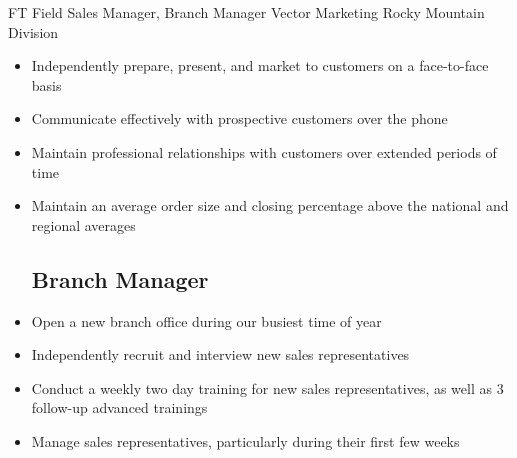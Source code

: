     {FT} %
    {Field Sales Manager, Branch Manager} %
    {Vector Marketing} %
    {Rocky Mountain Division}
    {\begin{itemize}
    \setlength\itemsep{0.1em}
        \subsection*{Field Sales Manager}
            \item Independently prepare, present, and market to customers on a face-to-face basis
            \item Communicate effectively with prospective customers over the phone
            \item Maintain professional relationships with customers over extended periods of time
            \item Maintain an average order size and closing percentage above the national and regional averages
        \subsection*{Branch Manager}
            \item Open a new branch office during our busiest time of year
            \item Independently recruit and interview new sales representatives
            \item Conduct a weekly two day training for new sales representatives, as well as 3 follow-up advanced trainings
\item Manage sales representatives, particularly during their first few weeks
    \end{itemize}
}
